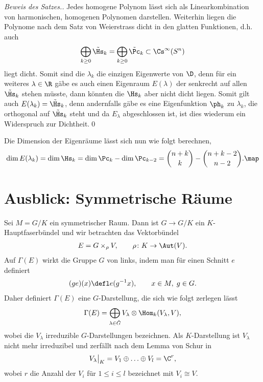 \documentclass[%
	paper=a5,%
	fleqn,%
	DIV=18,%
	BCOR=0mm,
	fontsize=11pt,
	titlepage=false,%
	bibliography=totoc,
	DIV=18,%
	twoside=true,
	pdftitle=Riemannsche Geometrie,
	pdfauthor=Uwe Semmelmann,
	numbers=noendperiod]%
	{scrbook}
\begin{document}
\begin{proof}[Beweis des Satzes.]
Jedes homogene Polynom lässt sich als Linearkombination von harmonischen, homogenen Polynomen darstellen. Weiterhin liegen die Polynome nach dem Satz von Weierstrass dicht in den glatten Funktionen, d.h. auch
\begin{align*}
\bigoplus_{k\ge 0}\tilde\Hs_{k} = \bigoplus_{k\ge 0}\tilde\Pc_{k} \subset \Cs^\infty(S^n)
\end{align*}
liegt dicht. Somit sind die $\lambda_{k}$ die einzigen Eigenwerte von $\D$, denn für ein weiteres $\lambda\in\R$ gäbe es auch einen Eigenraum $E(\lambda)$ der senkrecht auf allen $\tilde\Hs_{k}$ stehen müsste, dann könnten die $\Hs_{k}$ aber nicht dicht liegen. Somit gilt auch $E(\lambda_{k}) = \tilde\Hs_{k}$, denn andernfalls gäbe es eine Eigenfunktion $\ph_{k}$ zu $\lambda_{k}$, die orthogonal auf $\tilde\Hs_{k}$ steht und da $E_{\lambda}$ abgeschlossen ist, ist dies wiederum ein Widerspruch zur Dichtheit.\qed
\end{proof}

\begin{rem}
Die Dimension der Eigenräume lässt sich nun wie folgt berechnen,
\begin{align*}
\dim E(\lambda_{k}) = \dim \Hs_{k} = 
\dim \Pc_{k}-\dim\Pc_{k-2} =
\binom{n+k}{k} - 
\binom{n+k-2}{n-2}.\map
\end{align*}
\end{rem}

\section{Ausblick: Symmetrische Räume}

Sei $M=G/K$ ein symmetrischer Raum. Dann ist $G\to G/K$ ein $K$-Hauptfaserbündel und wir betrachten das Vektorbündel
\begin{align*}
E = G\times_{\rho}V,\qquad \rho\colon K\to \Aut(V).
\end{align*}
Auf $\Gamma(E)$ wirkt die Gruppe $G$ von links, indem man für einen Schnitt $e$ definiert
\begin{align*}
(ge)(x) \defl e(g^{-1}x),\qquad x\in M,\; g\in G.
\end{align*}
Daher definiert $\Gamma(E)$ eine $G$-Darstellung, die sich wie folgt zerlegen lässt
\begin{align*}
\Gamma(E) = \bigoplus_{\lambda\in\hat{G}} V_{\lambda}\otimes \Hom_{k}(V_{\lambda},V),
\end{align*}
wobei die $V_{\lambda}$ irreduzible $G$-Darstellungen bezeichnen. Als $K$-Darstellung ist $V_{\lambda}$ nicht mehr irreduzibel und zerfällt nach dem Lemma von Schur in
\begin{align*}
V_{\lambda}\big|_{K} = V_{1}\oplus \ldots \oplus V_{l} = \C^r,
\end{align*}
wobei $r$ die Anzahl der $V_{i}$ für $1\le i\le l$ bezeichnet mit $V_{i}\cong V$.
\end{document}
